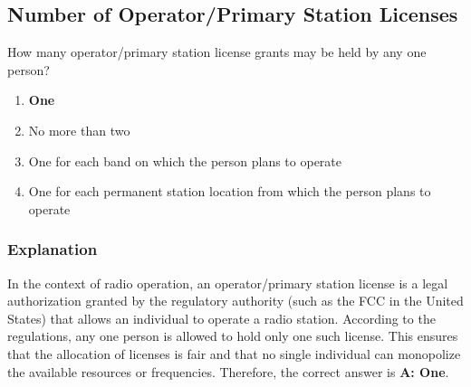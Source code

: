 \subsection{Number of Operator/Primary Station Licenses}
\label{T1A04}

\begin{tcolorbox}[colback=gray!10!white,colframe=black!75!black,title=T1A04]
How many operator/primary station license grants may be held by any one person?
\begin{enumerate}[label=\Alph*),noitemsep]
    \item \textbf{One}
    \item No more than two
    \item One for each band on which the person plans to operate
    \item One for each permanent station location from which the person plans to operate
\end{enumerate}
\end{tcolorbox}

\subsubsection*{Explanation}
In the context of radio operation, an operator/primary station license is a legal authorization granted by the regulatory authority (such as the FCC in the United States) that allows an individual to operate a radio station. According to the regulations, any one person is allowed to hold only one such license. This ensures that the allocation of licenses is fair and that no single individual can monopolize the available resources or frequencies. Therefore, the correct answer is \textbf{A: One}.